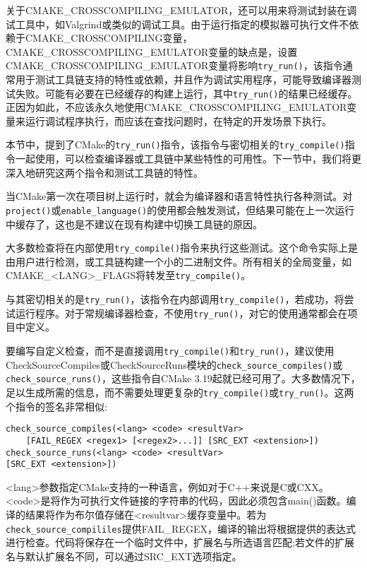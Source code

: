 关于CMAKE\_CROSSCOMPILING\_EMULATOR，还可以用来将测试封装在调试工具中，如Valgrind或类似的调试工具。由于运行指定的模拟器可执行文件不依赖于CMAKE\_CROSSCOMPILING变量，CMAKE\_CROSSCOMPILING\_EMULATOR变量的缺点是，设置CMAKE\_CROSSCOMPILING\_EMULATOR变量将影响\texttt{try\_run()}，该指令通常用于测试工具链支持的特性或依赖，并且作为调试实用程序，可能导致编译器测试失败。可能有必要在已经缓存的构建上运行，其中\texttt{try\_run()}的结果已经缓存。正因为如此，不应该永久地使用CMAKE\_CROSSCOMPILING\_EMULATOR变量来运行调试程序执行，而应该在查找问题时，在特定的开发场景下执行。

本节中，提到了CMake的\texttt{try\_run()}指令，该指令与密切相关的\texttt{try\_compile()}指令一起使用，可以检查编译器或工具链中某些特性的可用性。下一节中，我们将更深入地研究这两个指令和测试工具链的特性。


当CMake第一次在项目树上运行时，就会为编译器和语言特性执行各种测试。对\texttt{project()}或\texttt{enable\_language()}的使用都会触发测试，但结果可能在上一次运行中缓存了，这也是不建议在现有构建中切换工具链的原因。

大多数检查将在内部使用\texttt{try\_compile()}指令来执行这些测试。这个命令实际上是由用户进行检测，或工具链构建一个小的二进制文件。所有相关的全局变量，如CMAKE\_<LANG>\_FLAGS将转发至\texttt{try\_compile()}。

与其密切相关的是\texttt{try\_run()}，该指令在内部调用\texttt{try\_compile()}，若成功，将尝试运行程序。对于常规编译器检查，不使用\texttt{try\_run()}，对它的使用通常都会在项目中定义。

要编写自定义检查，而不是直接调用\texttt{try\_compile()}和\texttt{try\_run()}，建议使用CheckSourceCompiles或CheckSourceRuns模块的\texttt{check\_source\_compiles()}或\texttt{check\_source\_runs()}，这些指令自CMake 3.19起就已经可用了。大多数情况下，足以生成所需的信息，而不需要处理更复杂的\texttt{try\_compile()}或\texttt{try\_run()}。这两个指令的签名非常相似:

\begin{lstlisting}[style=styleCMake]
check_source_compiles(<lang> <code> <resultVar>
	[FAIL_REGEX <regex1> [<regex2>...]] [SRC_EXT <extension>])
check_source_runs(<lang> <code> <resultVar>
[SRC_EXT <extension>])
\end{lstlisting}

<lang>参数指定CMake支持的一种语言，例如对于C++来说是C或CXX。<code>是将作为可执行文件链接的字符串的代码，因此必须包含main()函数。编译的结果将作为布尔值存储在<resultvar>缓存变量中。若为\texttt{check\_source\_compililes}提供FAIL\_REGEX，编译的输出将根据提供的表达式进行检查。代码将保存在一个临时文件中，扩展名与所选语言匹配;若文件的扩展名与默认扩展名不同，可以通过SRC\_EXT选项指定。

